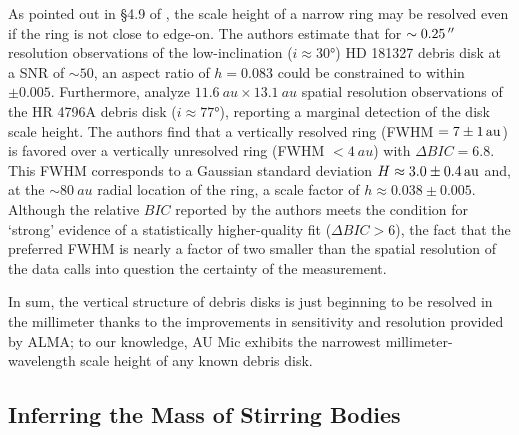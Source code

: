 \documentclass[modern]{aastex62}
\begin{document}
As pointed out in \S 4.9 of \cite{marino16}, the scale height of a narrow ring may be resolved even if the ring is not close to edge-on.
The authors estimate that for $\sim \SI{0.25}{\mbox{$^{\prime\prime}$}}$ resolution observations of the low-inclination ($i \approx \ang{30}$) HD 181327 debris disk at a SNR of $\sim 50$, an aspect ratio of $h=0.083$ could be constrained to within $\pm 0.005$. 
Furthermore, \cite{kennedy18} analyze $\SI{11.6}{au} \times \SI{13.1}{au}$ spatial resolution observations of the HR 4796A debris disk ($i \approx \ang{77}$), reporting a marginal detection of the disk scale height.
The authors find that a vertically resolved ring (FWHM $= \SI{7 \pm 1}{au}$) is favored over a vertically unresolved ring (FWHM $< \SI{4}{au}$) with $\Delta BIC = 6.8$. 
This FWHM corresponds to a Gaussian standard deviation $H \approx \SI{3.0 \pm 0.4}{au}$ and, at the $\sim \SI{80}{au}$ radial location of the ring, a scale factor of $h \approx 0.038 \pm 0.005$.
Although the relative $BIC$ reported by the authors meets the condition for `strong' evidence of a statistically higher-quality fit ($\Delta BIC > 6$), the fact that the preferred FWHM is nearly a factor of two smaller than the spatial resolution of the data calls into question the certainty of the measurement.

In sum, the vertical structure of debris disks is just beginning to be resolved in the millimeter thanks to the improvements in sensitivity and resolution provided by ALMA; to our knowledge, AU Mic exhibits the narrowest millimeter-wavelength scale height of any known debris disk.


\subsection{Inferring the Mass of Stirring Bodies}
\label{inferring mass}
\end{document}
